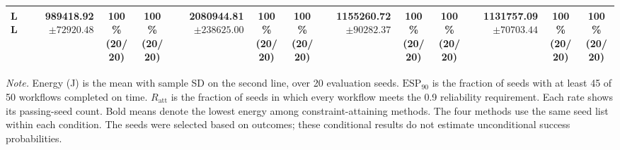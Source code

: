 \documentclass[10pt]{article}
\begin{document}
\begin{table}[!htbp]
\begin{tabular}{@{}l*{4}{rcc}@{}}
LL & \shortstack[r]{\textbf{989418.92}\\$\pm 72920.48$} & \shortstack[c]{100\%\\(20/20)} & \shortstack[c]{100\%\\(20/20)} & \shortstack[r]{2080944.81\\$\pm 238625.00$} & \shortstack[c]{100\%\\(20/20)} & \shortstack[c]{100\%\\(20/20)} & \shortstack[r]{1155260.72\\$\pm 90282.37$} & \shortstack[c]{100\%\\(20/20)} & \shortstack[c]{100\%\\(20/20)} & \shortstack[r]{1131757.09\\$\pm 70703.44$} & \shortstack[c]{100\%\\(20/20)} & \shortstack[c]{100\%\\(20/20)} \\
\bottomrule
\end{tabular}
\par\vspace{3pt}
\parbox{\textwidth}{\footnotesize
\textit{Note.} Energy (J) is the mean with sample SD on the second line, over 20 evaluation seeds.
$\mathrm{ESP}_{90}$ is the fraction of seeds with at least 45 of 50 workflows completed on time.
$R_{\mathrm{att}}$ is the fraction of seeds in which every workflow meets the 0.9 reliability requirement.
Each rate shows its passing-seed count. Bold means denote the lowest energy among constraint-attaining methods.
The four methods use the same seed list within each condition.
The seeds were selected based on outcomes; these conditional results do not estimate unconditional success probabilities.}
\endgroup
\end{table}
\clearpage
\end{document}
